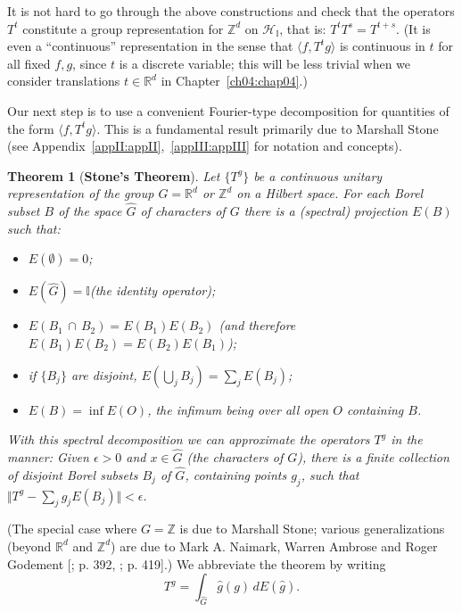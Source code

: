 \documentclass[reqno]{stml-l}
\theoremstyle{plain}
\newtheorem{theorem}{Theorem}[chapter]
\theoremstyle{definition}
\numberwithin{equation}{chapter}
\begin{document}
It is not hard to go through the above constructions and check that the operators $T^{t}$ constitute a group representation for $\mathbb{Z}^{d}$ on $\mathcal{H}_{\mathbb{I}}$, that is: $T^{t}T^{s}=T^{t+s}$. (It is even a ``continuous'' representation in the sense that $\langle f, T^{t}g\rangle$ is continuous in $t$ for all fixed $f,g$, since $t$ is a discrete variable; this will be less trivial when we consider translations $t\in \mathbb{R}^{d}$ in Chapter~\ref{ch04:chap04}.)

Our next step is to use a convenient Fourier-type decomposition for quantities of the form $\langle f, T^{t}g\rangle$. This is a fundamental result primarily due to Marshall Stone (see Appendix~\ref{appII:appII},~\ref{appIII:appIII} for notation and concepts).

\begin{theorem}[{\bf Stone's Theorem}]\label{ch03:thm3.1}
Let $\{T^{g}\}$ be a continuous unitary representation of the group $G=\mathbb{R}^{d}$ or $\mathbb{Z}^{d}$ on a Hilbert space. For each Borel subset $B$ of the space $\hat{G}$ of characters of $G$ there is a (spectral) projection $E(B)$ such that:
\begin{itemize}
\item $E(\emptyset)=0$;
\item $E(\hat{G})=\mathbb{I}$(the identity operator);
\item $E(B_{1}\,\cap\,B_{2})=E(B_{1})E(B_{2})$ (and therefore $E(B_{1})E(B_{2})=
E(B_{2})E(B_{1})$);
\item if $\{B_{j}\}$ are disjoint, $E(\bigcup_{j}B_{j})=\sum\nolimits_{j}E(B_{j})$;
\item $E(B)=\inf E(O)$, the infimum being over all open $O$ containing $B$.
\end{itemize}
With this spectral decomposition we can approximate the operators $T^{g}$ in the manner: Given $\epsilon>0$ and $x\in\hat{G}$ (the characters of $G$), there is a finite collection of disjoint Borel subsets $B_{j}$ of $\hat{G}$, containing points $g_{j}$, such that $\Vert T^{g}-\sum\nolimits_{j}g_{j}E(B_{j})\Vert<\epsilon$.
\end{theorem}

(The special case where $G=\mathbb{Z}$ is due to Marshall Stone; various generalizations (beyond $\mathbb{R}^{d}$ and $\mathbb{Z}^{d}$) are due to Mark A. Naimark, Warren Ambrose and Roger Godement [; p. 392, ; p. 419].) We abbreviate the theorem by writing
\begin{equation}
T^{g}=\int_{\hat{G}}\hat{g}(g)\,dE(\hat{g}).\label{ch03:eqn3.2}
\end{equation}
\end{document}
